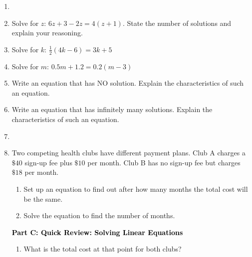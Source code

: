 \documentclass[12pt, letterpaper, fleqn]{article}
\begin{document}
\vspace{3mm}

\begin{enumerate}[itemsep=4.2cm, leftmargin=0.6cm, resume]
\item %
\item Solve for $z$: $6z + 3 - 2z = 4(z + 1)$. State the number of solutions and explain your reasoning.
\vspace{2cm}
\item Solve for $k$: $\frac{1}{2}(4k - 6) = 3k + 5$
\vspace{2cm}
\item Solve for $m$: $0.5m + 1.2 = 0.2(m - 3)$
\vspace{2cm}
\item Write an equation that has NO solution. Explain the characteristics of such an equation.
\vspace{2cm}
\item Write an equation that has infinitely many solutions. Explain the characteristics of such an equation.
\vspace{2cm}
\item %
\item Two competing health clubs have different payment plans. Club A charges a $\$40$ sign-up fee plus $\$10$ per month. Club B has no sign-up fee but charges $\$18$ per month.
    \begin{enumerate}[label=\alph*.]
\item Set up an equation to find out after how many months the total cost will be the same.
\item Solve the equation to find the number of months.
\end{enumerate}

\newpage

\begin{tcolorbox}[colback=customteal!20]
\large\textcolor{black}{\textbf{Part C: Quick Review: Solving Linear Equations}}
\end{tcolorbox}

\vspace{3mm}

\begin{enumerate}[itemsep=4.2cm, leftmargin=0.6cm, resume]
\item What is the total cost at that point for both clubs?


\end{enumerate}
\end{enumerate}
\end{document}
